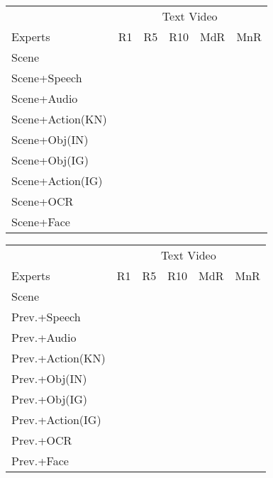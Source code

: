 \documentclass{bmvc2k}
\begin{document}
\begin{table}[h!]
\hspace{-0.25cm}
\begin{minipage}{0.45\linewidth}
\centering 
\scriptsize 
\setlength{\tabcolsep}{2pt}
\begin{tabular}{l c c c c c}
\hline \hline
\multicolumn{1}{c}{} & 
\multicolumn{5}{c}{Text  Video}  \\
Experts & R1 \hspace{0.5em} & R5 \hspace{0.5em} & R10\hspace{0.5em} & MdR\hspace{0.5em} & MnR\hspace{0.5em}  \\ 
\hline 

Scene &	&	&	&	& \\
Scene+Speech &	&	&	&	& \\
Scene+Audio &	&	&	&	& \\
Scene+Action(KN) &	&	&	&	& \\
Scene+Obj(IN) &	&	&	&	& \\
Scene+Obj(IG) &	&	&	&	& \\
Scene+Action(IG) &	&	&	&	& \\
Scene+OCR	&	&	&	&	& \\
Scene+Face &	&	&	&	& \\
\hline \hline
\end{tabular}
\end{minipage}
\hspace{0.6cm}
\begin{minipage}{0.45\linewidth}
\centering 
\scriptsize 
\setlength{\tabcolsep}{2pt}
\begin{tabular}{l c c c c c}
\hline \hline
\multicolumn{1}{c}{} & 
\multicolumn{5}{c}{Text  Video}  \\
Experts & R1 \hspace{0.5em} & R5 \hspace{0.5em} & R10\hspace{0.5em} & MdR\hspace{0.5em} & MnR\hspace{0.5em}  \\ 
\hline 
Scene &	&	&	&	& \\
Prev.+Speech &	&	&	&	& \\
Prev.+Audio	&	&	&	&	& \\
Prev.+Action(KN)	&	&	&	&	& \\
Prev.+Obj(IN) &	&	&	&	& \\
Prev.+Obj(IG)	&	&	&	&	& \\
Prev.+Action(IG)	&	&	&	&	& \\
Prev.+OCR	&	&	&	&	& \\
Prev.+Face &	&	&	&	& \\
\hline \hline


\end{tabular}
\end{minipage}
\end{table}
\end{document}
